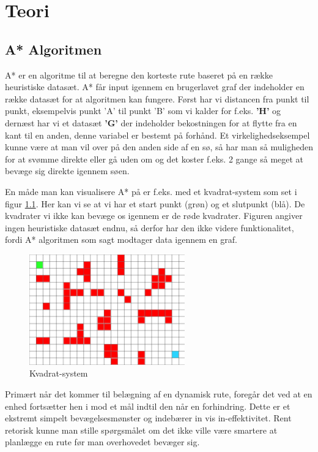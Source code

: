 \chapter{Teori}

\section{A* Algoritmen}

A* er en algoritme til at beregne den korteste rute baseret på en række heuristiske datasæt. A* får input igennem en brugerlavet graf der indeholder en række datasæt for at algoritmen kan fungere.  Først har vi distancen fra punkt til punkt, eksempelvis punkt 'A' til punkt 'B' som vi kalder for f.eks. \textbf{'H'} og dernæst har vi et datasæt \textbf{'G'} der indeholder bekostningen for at flytte fra en kant til en anden, denne variabel er bestemt på forhånd. Et virkelighedseksempel kunne være at man vil over på den anden side af en sø, så har man så muligheden for at svømme direkte eller gå uden om og det koster f.eks. 2 gange så meget at bevæge sig direkte igennem søen. \cite{trafikoekonomi}

\vspace{5mm}

En måde man kan visualisere A* på er f.eks. med et kvadrat-system som set i figur \ref{A*Kvadrat-1}. Her kan vi se at vi har et start punkt (grøn) og et slutpunkt (blå). De kvadrater vi ikke kan bevæge os igennem er de røde kvadrater. Figuren angiver ingen heuristiske datasæt endnu, så derfor har den ikke videre funktionalitet, fordi A* algoritmen som sagt modtager data igennem en graf.

\begin{figure}
    \centering
    \includegraphics[width=0.60\textwidth]{Pictures/Teoriafsnit/Figurfiler/Grid1.png}
    \caption{Kvadrat-system}
    \label{A*Kvadrat-1}
\end{figure}

Primært når det kommer til belægning af en dynamisk rute, foregår det ved at en enhed fortsætter hen i mod et mål indtil den når en forhindring. Dette er et ekstremt simpelt bevægelsesmønster og indebærer in vis in-effektivitet. Rent retorisk kunne man stille spørgsmålet om det ikke ville være smartere at planlægge en rute før man overhovedet bevæger sig.
